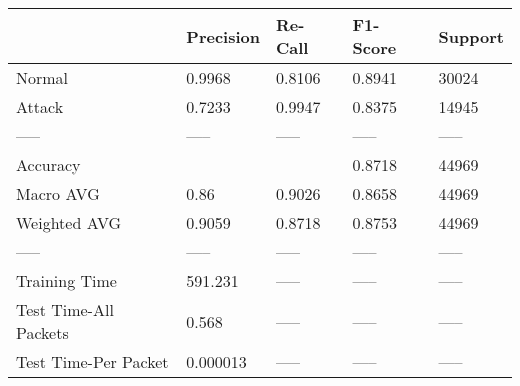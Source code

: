 \begin{tabular}{lllll}
\toprule
{} & Precision & Re-Call & F1-Score & Support \\
\midrule
Normal                &    0.9968 &  0.8106 &   0.8941 &   30024 \\
Attack                &    0.7233 &  0.9947 &   0.8375 &   14945 \\
-----                 &     ----- &   ----- &    ----- &   ----- \\
Accuracy              &           &         &   0.8718 &   44969 \\
Macro AVG             &      0.86 &  0.9026 &   0.8658 &   44969 \\
Weighted AVG          &    0.9059 &  0.8718 &   0.8753 &   44969 \\
-----                 &     ----- &   ----- &    ----- &   ----- \\
Training Time         &   591.231 &   ----- &    ----- &   ----- \\
Test Time-All Packets &     0.568 &   ----- &    ----- &   ----- \\
Test Time-Per Packet  &  0.000013 &   ----- &    ----- &   ----- \\
\bottomrule
\end{tabular}
